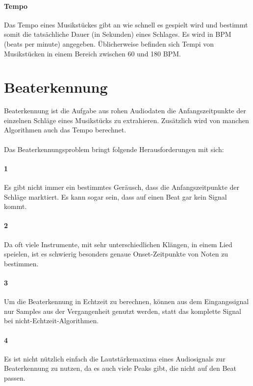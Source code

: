 {	\paragraph{Tempo}
	{
		Das Tempo eines Musikstückes gibt an wie schnell es gespielt wird
			und bestimmt somit die tatsächliche Dauer (in Sekunden) eines Schlages.
		Es wird in BPM (beats per minute) angegeben.
		Üblicherweise befinden sich Tempi von Musikstücken in einem Bereich zwischen 60 und 180 BPM.
	}
}

\section{Beaterkennung}
{
	Beaterkennung ist die Aufgabe aus rohen Audiodaten die Anfangszeitpunkte der einzelnen Schläge eines Musikstücks zu extrahieren.
	Zusätzlich wird von manchen Algorithmen auch das Tempo berechnet.

	\paragraph{}
	{
		Das Beaterkennungsproblem bringt folgende Herausforderungen mit sich:
	}

	\paragraph{1} %
	{
		Es gibt nicht immer ein bestimmtes Geräusch,
			dass die Anfangszeitpunkte der Schläge marktiert.
		Es kann sogar sein, dass auf einen Beat gar kein Signal kommt.
	}

	\paragraph{2} %
	{
		Da oft viele Instrumente, mit sehr unterschiedlichen Klängen, in einem Lied speielen,
			ist es schwierig besonders genaue Onset-Zeitpunkte von Noten zu bestimmen.
	}

	\paragraph{3} %
	{
		Um die Beaterkennung in Echtzeit zu berechnen,
			können aus dem Eingangssignal nur Samples aus der Vergangenheit genutzt werden,
			statt das komplette Signal bei nicht-Echtzeit-Algorithmen.
	}

	\paragraph{4} %
	{
		Es ist nicht nützlich einfach die Lautstärkemaxima eines Audiosignals zur Beaterkennung zu nutzen,
			da es auch viele Peaks gibt,
			die nicht auf den Beat passen.
	}

}
